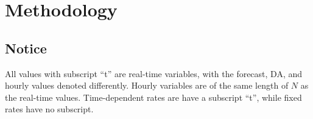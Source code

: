 \documentclass[conference]{IEEEtran}
\begin{document}

















\section{Methodology}

\subsection{Notice}
All values with subscript ``t'' are real-time variables, with the forecast, DA, and hourly values denoted differently. Hourly variables are of the same length of $N$ as the real-time values. Time-dependent rates are have a subscript ``t'', while fixed rates have no subscript.
\end{document}

